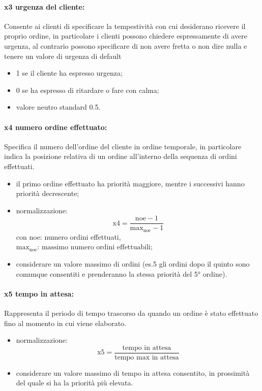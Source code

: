 \paragraph{x3 urgenza del cliente:}
Consente ai clienti di specificare la tempestività con cui desiderano ricevere il proprio ordine, in particolare i clienti possono chiedere espressamente di avere urgenza, al contrario possono specificare di non avere fretta o non dire nulla e tenere un valore di urgenza di default
\begin{itemize}
	\item 1 se il cliente ha espresso urgenza;
	\item 0 se ha espresso di ritardare o fare con calma;
	\item valore neutro standard 0.5.
\end{itemize}

\paragraph{x4 numero ordine effettuato:}
Specifica il numero dell’ordine del cliente in ordine temporale, in particolare indica la posizione relativa di un ordine all'interno della sequenza di ordini effettuati.
\begin{itemize}
	\item il primo ordine effettuato ha priorità maggiore, mentre i successivi hanno priorità decrescente;
	\item normalizzazione: \begin{equation*}
		\text{x4} = \frac{\text{noe} - 1}{\text{max}_{\text{noe}} - 1}
	\end{equation*} con noe: numero ordini effettuati,\\
	$\text{max}_{\text{noe}} \text{: massimo numero ordini effettuabili;}$
	\item considerare un valore massimo di ordini (es.5 gli ordini dopo il quinto sono comunque consentiti e prenderanno la stessa priorità del 5° ordine).
\end{itemize}

\paragraph{x5 tempo in attesa:}
Rappresenta il periodo di tempo trascorso da quando un ordine è stato effettuato fino al momento in cui viene elaborato.
\begin{itemize}
	\item normalizzazione: \begin{equation*}
		\text{x5} = \frac{\text{tempo in attesa}}{\text{tempo max in attesa}}
	\end{equation*}
	\item considerare un valore massimo di tempo in attesa consentito, in prossimità del quale si ha la priorità più elevata.
\end{itemize}

